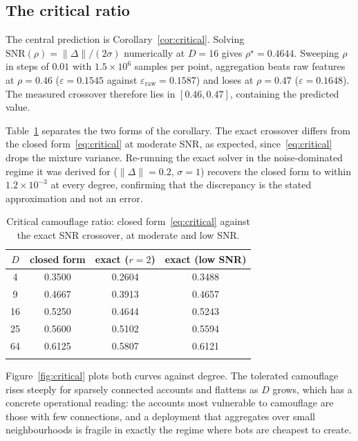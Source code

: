\documentclass[onecolumn,pdflatex,sn-basic,Numbered]{sn-jnl}
\theoremstyle{thmstyleone}
\theoremstyle{thmstylethree}
\begin{document}
\subsection{The critical ratio}

The central prediction is Corollary~\ref{cor:critical}. Solving
$\mathrm{SNR}(\rho) = \|\Delta\|/(2\sigma)$ numerically at $D=16$ gives
$\rho^\star = 0.4644$. Sweeping $\rho$ in steps of $0.01$ with $1.5\times 10^6$
samples per point, aggregation beats raw features at $\rho = 0.46$
($\varepsilon = 0.1545$ against $\varepsilon_{\mathrm{raw}} = 0.1587$) and loses at
$\rho = 0.47$ ($\varepsilon = 0.1648$). The measured crossover therefore lies in
$[0.46, 0.47]$, containing the predicted value.

Table~\ref{tab:critical} separates the two forms of the corollary. The exact
crossover differs from the closed form~\eqref{eq:critical} at moderate SNR, as
expected, since~\eqref{eq:critical} drops the mixture variance. Re-running the
exact solver in the noise-dominated regime it was derived for ($\|\Delta\| = 0.2$,
$\sigma = 1$) recovers the closed form to within $1.2\times10^{-3}$ at every degree,
confirming that the discrepancy is the stated approximation and not an error.

\begin{table}[t]
\centering
\caption{Critical camouflage ratio: closed form~\eqref{eq:critical} against the
exact SNR crossover, at moderate and low SNR.}
\label{tab:critical}
\small
\begin{tabular}{@{}cccc@{}}
\toprule
$D$ & closed form & exact ($r=2$) & exact (low SNR) \\
\midrule
4  & 0.3500 & 0.2604 & 0.3488 \\
9  & 0.4667 & 0.3913 & 0.4657 \\
16 & 0.5250 & 0.4644 & 0.5243 \\
25 & 0.5600 & 0.5102 & 0.5594 \\
64 & 0.6125 & 0.5807 & 0.6121 \\
\botrule
\end{tabular}
\end{table}

Figure~\ref{fig:critical} plots both curves against degree. The tolerated
camouflage rises steeply for sparsely connected accounts and flattens as $D$ grows,
which has a concrete operational reading: the accounts most vulnerable to
camouflage are those with few connections, and a deployment that aggregates over
small neighbourhoods is fragile in exactly the regime where bots are cheapest to
create.
\end{document}
